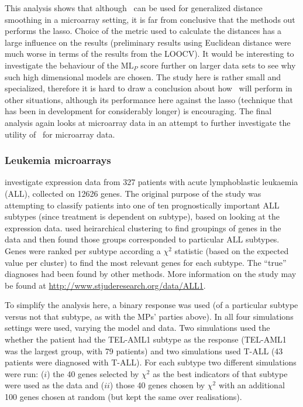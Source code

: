 This analysis shows that although \mdsds\ can be used for generalized distance smoothing in a microarray setting, it is far from conclusive that the methods out performs the lasso. Choice of the metric used to calculate the distances has a large influence on the results (preliminary results using Euclidean distance were much worse in terms of the results from the LOOCV). It would be interesting to investigate the behaviour of the $\text{ML}_P$ score further on larger data sets to see why such high dimensional models are chosen. The study here is rather small and specialized, therefore it is hard to draw a conclusion about how \mdsds\ will perform in other situations, although its performance here against the lasso (technique that has been in development for considerably longer) is encouraging. The final analysis again looks at microarray data in an attempt to further investigate the utility of \mdsds\ for microarray data.

\subsubsection{Leukemia microarrays}

 investigate expression data from 327 patients with acute lymphoblastic leukaemia (ALL), collected on 12626 genes. The original purpose of the study was attempting to classify patients into one of ten prognostically important ALL subtypes (since treatment is dependent on subtype), based on looking at the expression data.  used heirarchical clustering to find groupings of genes in the data and then found those groups corresponded to particular ALL subtypes. Genes were ranked per subtype according a $\chi^2$ statistic (based on the expected value per cluster) to find the most relevant genes for each subtype. The ``true'' diagnoses had been found by other methods. More information on the study may be found at \url{http://www.stjuderesearch.org/data/ALL1}.

To simplify the analysis here, a binary response was used (of a particular subtype versus not that subtype, as with the MPs' parties above). In all four simulations settings were used, varying the model and data. Two simulations used the whether the patient had the TEL-AML1 subtype as the response (TEL-AML1 was the largest group, with 79 patients) and two simulations used T-ALL (43 patients were diagnosed with T-ALL). For each subtype two different simulations were run: ($i$) the 40 genes selected by $\chi^2$ as the best indicators of that subtype were used as the data and ($ii$) those 40 genes chosen by $\chi^2$ with an additional 100 genes chosen at random (but kept the same over realisations). 

